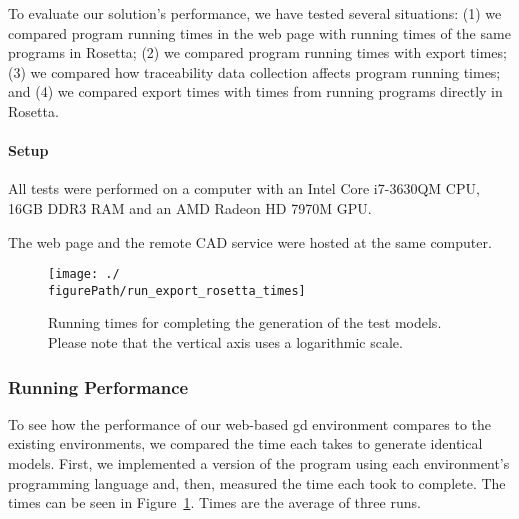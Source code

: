 To evaluate our solution's performance, we have tested several situations: (1) we compared program running times in the web page with running times of the same programs in Rosetta; (2) we compared program running times with export times; (3) we compared how traceability data collection affects program running times; and (4) we compared export times with times from running programs directly in Rosetta.

\paragraph{Setup}
All tests were performed on a computer with an Intel Core i7-3630QM CPU, 16GB DDR3 RAM and an AMD Radeon HD 7970M GPU.

The web page and the remote CAD service were hosted at the same computer.


\begin{figure}
  \centering
  \texttt{[image: ./\\figurePath/run\_export\_rosetta\_times]}
  \caption[Running times for completing the generation of the test models.]{Running times for completing the generation of the test models. Please note that the vertical axis uses a logarithmic scale.}
  \label{fig:run:export:rosetta:chart}
\end{figure}


\subsubsection{Running Performance}

To see how the performance of our web-based \gls{gd} environment compares to the existing environments, we compared the time each takes to generate identical models.
First, we implemented a version of the program using each environment's programming language and, then, measured the time each took to complete.
The times can be seen in Figure~\ref{fig:run:export:rosetta:chart}.
Times are the average of three runs.

